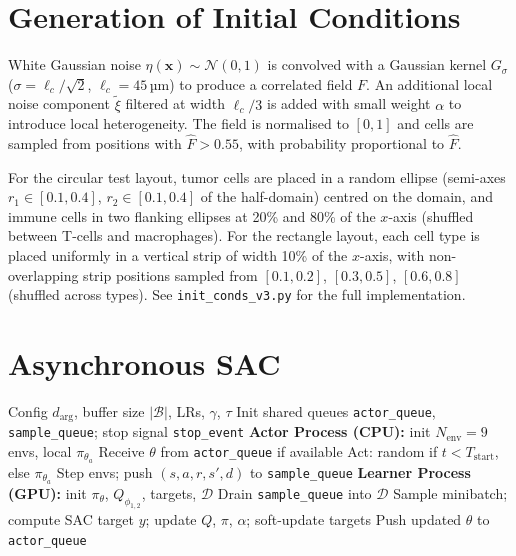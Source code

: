\documentclass{article}
\begin{document}



\appendix

\section{Generation of Initial Conditions}
\label{app:ic}

White Gaussian noise $\eta(\mathbf{x})\sim\mathcal{N}(0,1)$ is convolved
with a Gaussian kernel $G_\sigma$ ($\sigma=\ell_c/\sqrt{2}$,
$\ell_c=45$\,µm) to produce a correlated field $F$.
An additional local noise component $\tilde\xi$ filtered at width
$\ell_c/3$ is added with small weight $\alpha$ to introduce local
heterogeneity.
The field is normalised to $[0,1]$ and cells are sampled from positions
with $\hat{F}>0.55$, with probability proportional to $\hat{F}$.

For the circular test layout, tumor cells are placed in a random ellipse
(semi-axes $r_1 \in [0.1,0.4]$, $r_2 \in [0.1,0.4]$ of the half-domain)
centred on the domain, and immune cells in two flanking ellipses at 20\%
and 80\% of the $x$-axis (shuffled between T-cells and macrophages).
For the rectangle layout, each cell type is placed uniformly in a vertical
strip of width 10\% of the $x$-axis, with non-overlapping strip positions
sampled from $[0.1,0.2]$, $[0.3,0.5]$, $[0.6,0.8]$ (shuffled across types).
See \texttt{init\_conds\_v3.py} for the full implementation.

\section{Asynchronous SAC}
\label{app:async_sac}

\begin{algorithm}[H]
\caption{Asynchronous SAC with Parallel Environments~\citep{liu2025asynchronous}}
\label{alg:async_sac}
\begin{algorithmic}[1]
\Require Config $d_\text{arg}$, buffer size $|\mathcal{B}|$, LRs, $\gamma$, $\tau$
\State Init shared queues \texttt{actor\_queue}, \texttt{sample\_queue};
       stop signal \texttt{stop\_event}
\State \textbf{Actor Process (CPU):} init $N_\text{env}=9$ envs, local $\pi_{\theta_a}$
  \State Receive $\theta$ from \texttt{actor\_queue} if available
  \State Act: random if $t\!<\!T_\text{start}$, else $\pi_{\theta_a}$
  \State Step envs; push $(s,a,r,s',d)$ to \texttt{sample\_queue}
\EndWhile
\State \textbf{Learner Process (GPU):} init $\pi_\theta$, $Q_{\phi_{1,2}}$, targets, $\mathcal{D}$
  \State Drain \texttt{sample\_queue} into $\mathcal{D}$
    \State Sample minibatch; compute SAC target $y$; update $Q$, $\pi$, $\alpha$;
           soft-update targets
  \EndFor
  \State Push updated $\theta$ to \texttt{actor\_queue}
\EndWhile
\end{algorithmic}
\end{algorithm}
\end{document}
